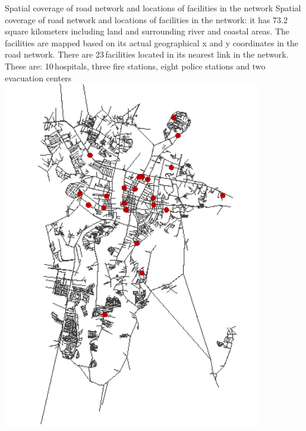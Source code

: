 \createfigure%
{Spatial coverage of road network and locations of facilities in the network}%
{Spatial coverage of road network and locations of facilities in the network: it has 73.2\,square kilometers including land and surrounding river and coastal areas. The facilities are mapped based on its actual geographical x and y coordinates in the road network. There are 23\,facilities located in its nearest link in the network. These are: 10\,hospitals, three fire stations, eight police stations and two evacuation centers}%
{\label{fig:philippines_fig3}}%
{\includegraphics[width=0.85\textwidth, angle=0]{./scenarios/figures/philippines_fig3.png}}%
{}

